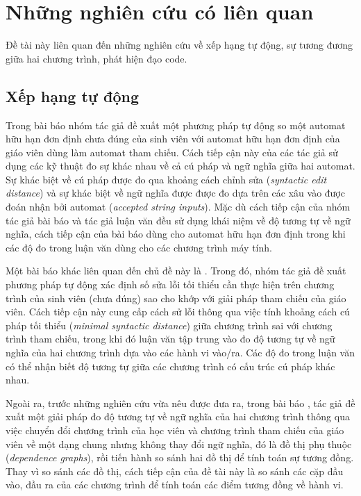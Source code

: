 \section{Những nghiên cứu có liên quan}

Đề tài này liên quan đến những nghiên cứu về xếp hạng tự động, sự
tương đương giữa hai chương trình, phát hiện đạo code.

\subsection*{Xếp hạng tự động}
	
Trong bài báo \cite{alur2013automated} nhóm tác giả đề xuất một phương
pháp tự động so một automat hữu hạn đơn định chưa đúng của sinh viên
với automat hữu hạn đơn định của giáo viên dùng làm automat tham
chiếu. Cách tiếp cận này của các tác giả sử dụng các kỹ thuật đo sự
khác nhau về cả cú pháp và ngữ nghĩa giữa hai automat. Sự khác biệt về
cú pháp được đo qua khoảng cách chỉnh sửa (\emph{syntactic edit
  distance}) và sự khác biệt về ngữ nghĩa được được đo dựa trên các
xâu vào được đoán nhận bởi automat (\emph{accepted string
  inputs}). Mặc dù cách tiếp cận của nhóm tác giả bài báo và tác giả
luận văn đều sử dụng khái niệm về độ tương tự về ngữ nghĩa, cách tiếp
cận của bài báo dùng cho automat hữu hạn đơn định trong khi các độ đo
trong luận văn dùng cho các chương trình máy tính.

Một bài báo khác liên quan đến chủ đề này là \cite{singh2013automated}. Trong đó, nhóm tác giả đề xuất phương pháp tự động
xác định số sửa lỗi tối thiểu cần thực hiện trên chương trình của sinh viên (chưa đúng) sao cho khớp với giải pháp tham chiếu của giáo viên. Cách tiếp cận này cung cấp cách sử lỗi thông qua việc tính khoảng cách cú pháp tối thiểu (\emph{minimal syntactic distance}) giữa chương trình sai với chương trình tham chiếu, trong khi đó luận văn tập trung vào đo độ tương tự về ngữ nghĩa của hai chương trình dựa vào các hành vi vào/ra. Các độ đo trong luận văn có thể nhận biết độ tương tự giữa các chương trình có cấu trúc cú pháp khác nhau.

Ngoài ra, trước những nghiên cứu vừa nêu được đưa ra, trong bài báo
\cite{wang2007semantic}, tác giả đề xuất một giải pháp đo độ tương tự
về ngữ nghĩa của hai chương trình thông qua việc chuyển đổi chương
trình của học viên và chương trình tham chiếu của giáo viên về một
dạng chung nhưng không thay đổi ngữ nghĩa, đó là đồ thị phụ thuộc
(\emph{dependence graphs}), rồi tiến hành so sánh hai đồ thị để tính
toán sự tương đồng. Thay vì so sánh các đồ thị, cách tiếp cận của đề
tài này là so sánh các cặp đầu vào, đầu ra của các chương trình để
tính toán các điểm tương đồng về hành vi.
	
